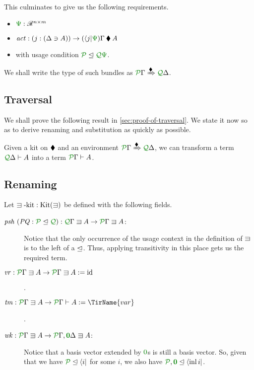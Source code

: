 \documentclass[submission,copyright,creativecommons]{eptcs}
\begin{document}
This culminates to give us the following requirements.

\begin{itemize}
  \item $\rescomment\Psi : \mathscr R^{n \times m}$
  \item $\mathit{act} :
    (j : (\Delta \ni A)) \to (\langle j \rvert\rescomment\Psi)\Gamma \kitrel A$
  \item with usage condition $\resctx P \subres \resctx Q \rescomment\Psi$.
\end{itemize}

We shall write the type of such bundles as
$\ctx{\Gamma}{P} \subst{\kitrel} \ctx{\Delta}{Q}$.

\subsection{Traversal}

We shall prove the following result in \autoref{sec:proof-of-traversal}.
We state it now so as to derive renaming and substitution as quickly as
possible.

\newcommand{\thmtrav}{%
  Given a kit on $\kitrel$ and an environment
  $\ctx{\Gamma}{P} \subst{\kitrel} \ctx{\Delta}{Q}$, we can transform a term
  $\ctx{\Delta}{Q} \vdash A$ into a term $\ctx{\Gamma}{P} \vdash A$.%
}
\begin{theorem}[traversal]\label{thm:trav}
  \thmtrav
\end{theorem}

\subsection{Renaming}

\begin{definition}\label{def:lvar-kit}
  Let $\lvar\textrm{-kit} : \kit(\lvar)$ be defined with the following
  fields.
  \begin{description}
    \item[$\mathit{psh}~(\mathit{PQ} : \resctx P \subres \resctx Q)
      : \ctx{\Gamma}{Q} \lvar A \to \ctx{\Gamma}{P} \lvar A$:]
      Notice that the only occurrence of the usage context in the definition of
      $\lvar$ is to the left of a $\trianglelefteq$.
      Thus, applying transitivity in this place gets us the required term.
    \item[$\mathit{vr} : \ctx{\Gamma}{P} \lvar A \to \ctx{\Gamma}{P} \lvar A
      := \mathrm{id}$].
    \item[$\mathit{tm} : \ctx{\Gamma}{P} \lvar A \to \ctx{\Gamma}{P} \vdash A
      := \TirName{var}$].
    \item[$\mathit{wk} : \ctx{\Gamma}{P} \lvar A
      \to \ctx{\Gamma}{P}, \ctx{\Delta}{\vct 0} \lvar A$:]
      Notice that a basis vector extended by $\rescomment 0$s is still a basis
      vector.
      So, given that we have $\resctx P \subres \langle i \rvert$ for some $i$,
      we also have
      $\resctx P, \rescomment{\vct 0} \subres \langle \inl i \rvert$.
  \end{description}
\end{definition}
\end{document}
